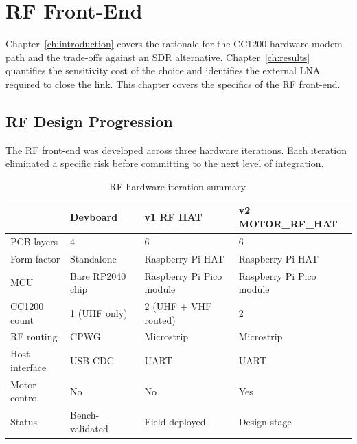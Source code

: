 \chapter{RF Front-End}
\label{ch:rf-frontend}

Chapter~\ref{ch:introduction} covers the rationale for the CC1200 hardware-modem path and the trade-offs against an SDR alternative. Chapter~\ref{ch:results} quantifies the sensitivity cost of the choice and identifies the external LNA required to close the link. This chapter covers the specifics of the RF front-end.

\section{RF Design Progression}
\label{sec:rf-progression}

The RF front-end was developed across three hardware iterations. Each iteration eliminated a specific risk before committing to the next level of integration.

\begin{table}[H]
    \centering
    \caption{RF hardware iteration summary.}
    \small
    \renewcommand{\arraystretch}{1.2}
    \begin{tabularx}{\textwidth}{l X X X}
        \toprule
        & \textbf{Devboard} & \textbf{v1 RF HAT} & \textbf{v2 MOTOR\_RF\_HAT} \\
        \midrule
        PCB layers      & 4                    & 6                         & 6 \\
        Form factor     & Standalone           & Raspberry Pi HAT          & Raspberry Pi HAT \\
        MCU             & Bare RP2040 chip     & Raspberry Pi Pico module  & Raspberry Pi Pico module \\
        CC1200 count    & 1 (UHF only)         & 2 (UHF + VHF routed)      & 2 \\
        RF routing      & CPWG                 & Microstrip                & Microstrip \\
        Host interface  & USB CDC              & UART                      & UART \\
        Motor control   & No                   & No                        & Yes \\
        Status          & Bench-validated      & Field-deployed            & Design stage \\
        \bottomrule
    \end{tabularx}
    \label{tab:rf-iterations}
\end{table}

